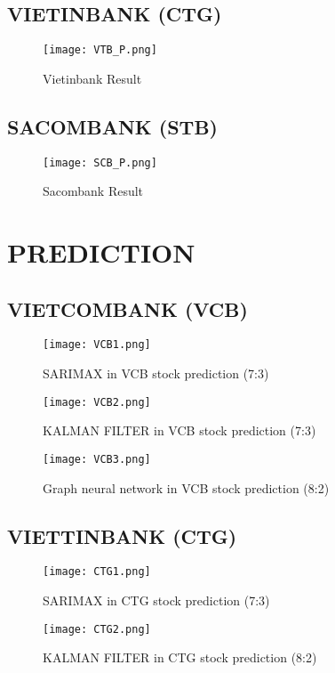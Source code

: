 \documentclass{ieeeojies}
\begin{document}
\subsection{VIETINBANK (CTG)}
\begin{figure}[ht]
  \centering
  \texttt{[image: VTB\_P.png]}
  \caption{Vietinbank Result}
  \label{fig:CTG}
\end{figure}
\subsection{SACOMBANK (STB)}
\begin{figure}[ht]
  \centering
  \texttt{[image: SCB\_P.png]}
  \caption{Sacombank Result}
  \label{fig:STB}
\end{figure}
\vspace{30mm}
\section{PREDICTION}
\subsection{VIETCOMBANK (VCB)}
\begin{figure}[ht]
  \centering
  \texttt{[image: VCB1.png]}
  \caption{SARIMAX in VCB stock prediction (7:3)}
  \label{fig:example}
\end{figure}

\begin{figure}[ht]
  \centering
  \texttt{[image: VCB2.png]}
  \caption{KALMAN FILTER in VCB stock prediction (7:3)}
  \label{fig:example}
\end{figure}

\begin{figure}[ht]
  \centering
  \texttt{[image: VCB3.png]}
  \caption{Graph neural network in VCB stock prediction (8:2)}
  \label{fig:example}
\end{figure}
\subsection{VIETTINBANK (CTG)}
\begin{figure}[h]
  \centering
  \texttt{[image: CTG1.png]}
  \caption{SARIMAX in CTG stock prediction (7:3)}
  \label{fig:example}
\end{figure}
\begin{figure}[h]
  \centering
  \texttt{[image: CTG2.png]}
  \caption{KALMAN FILTER in CTG stock prediction (8:2)}
  \label{fig:example}
\end{figure}
\end{document}
